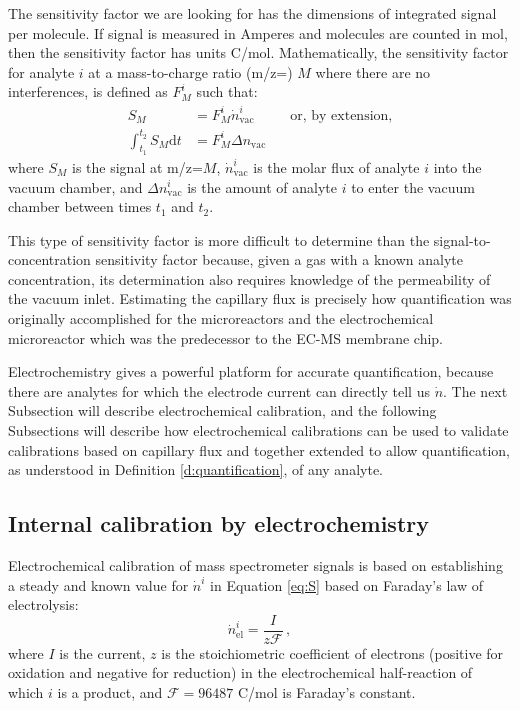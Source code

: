 The sensitivity factor we are looking for has the dimensions of integrated signal per molecule. If signal is measured in Amperes and molecules are counted in mol, then the sensitivity factor has units C/mol. Mathematically, the sensitivity factor for analyte $i$ at a mass-to-charge ratio (m/z=) $M$ where there are no interferences, is defined as $F^i_M$ such that:
\begin{align}
S_M &= F_M^i \dot{n}^i_{\text{vac}}\,\hspace{1cm}\text{or, by extension,} \label{eq:S}\\
\int_{t_1}^{t_2} S_M \mathrm{d}t &= F_M^i \Delta n_{\text{vac}} \label{eq:int_S}
\end{align}
where $S_M$ is the signal at m/z=$M$, $\dot{n}^i_\text{vac}$ is the molar flux of analyte $i$ into the vacuum chamber, and $\Delta n_\text{vac}^i$ is the amount of analyte $i$ to enter the vacuum chamber between times $t_1$ and $t_2$.

This type of sensitivity factor is more difficult to determine than the signal-to-concentration sensitivity factor because, given a gas with a known analyte concentration, its determination also requires knowledge of the permeability of the vacuum inlet. Estimating the capillary flux is precisely how quantification was originally accomplished for the microreactors \cite{Henriksen2009} and the electrochemical microreactor which was the predecessor to the EC-MS membrane chip\cite{Trimarco2015}. 

Electrochemistry gives a powerful platform for accurate quantification, because there are analytes for which the electrode current can directly tell us $\dot{n}$. The next Subsection will describe electrochemical calibration, and the following Subsections will describe how electrochemical calibrations can be used to validate calibrations based on capillary flux and together extended to allow quantification, as understood in Definition \ref{d:quantification}, of any analyte.

\subsection{Internal calibration by electrochemistry}\label{subsec:internal}

Electrochemical calibration of mass spectrometer signals is based on establishing a steady and known value for $\dot{n}^i$ in Equation \ref{eq:S} based on Faraday's law of electrolysis:
\begin{equation}
\dot{n}^i_\text{el} = \frac{I}{z\mathcal{F}}\,,\label{eq:Far}
\end{equation}
where $I$ is the current, $z$ is the stoichiometric coefficient of electrons (positive for oxidation and negative for reduction) in the electrochemical half-reaction of which $i$ is a product, and $\mathcal{F}=96487$ C/mol is Faraday's constant.

